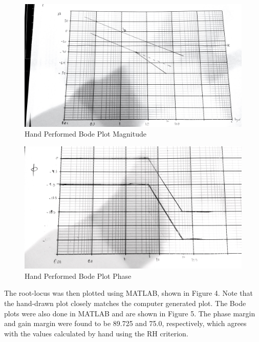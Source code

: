 \documentclass[12pt]{article}
\begin{document}
\begin{figure}[h!] %
   \centering
   \includegraphics[width=6in]{hand_drawn_bode_plot_magnitude.jpg} 
   \caption{Hand Performed Bode Plot Magnitude}
   \label{fig:example}
\end{figure}

\newpage

\begin{figure}[h!] %
   \centering
   \includegraphics[width=6in]{hand_drawn_bode_plot_phase.jpg} 
   \caption{Hand Performed Bode Plot Phase}
   \label{fig:example}
\end{figure}

\bigskip

The root-locus was then plotted using MATLAB, shown in Figure 4. Note that the hand-drawn plot closely matches the computer generated plot. The Bode plots were also done in MATLAB and are shown in Figure 5. The phase margin and gain margin were found to be 89.725 and 75.0, respectively, which agrees with the values calculated by hand using the RH criterion. 
\bigskip
 
\end{document}
